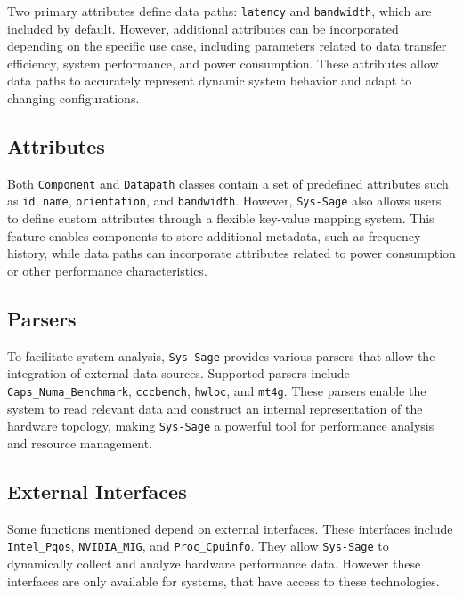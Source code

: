 Two primary attributes define data paths: \texttt{latency} and \texttt{bandwidth}, which are included by default. However, additional attributes can be incorporated depending on the specific use case, including parameters related to data transfer efficiency, system performance, and power consumption. These attributes allow data paths to accurately represent dynamic system behavior and adapt to changing configurations.\cite[see Data Path]{sys-sage-docu}

\subsection{Attributes}

Both \texttt{Component} and \texttt{Datapath} classes contain a set of predefined attributes such as \texttt{id}, \texttt{name}, \texttt{orientation}, and \texttt{bandwidth}. However, \texttt{Sys-Sage} also allows users to define custom attributes through a flexible key-value mapping system. This feature enables components to store additional metadata, such as frequency history, while data paths can incorporate attributes related to power consumption or other performance characteristics.\cite[see Component, Datapath]{sys-sage-docu}

\subsection{Parsers}

To facilitate system analysis, \texttt{Sys-Sage} provides various parsers that allow the integration of external data sources. Supported parsers include \texttt{Caps\_Numa\_Benchmark}, \texttt{cccbench}, \texttt{hwloc}, and \texttt{mt4g}. These parsers enable the system to read relevant data and construct an internal representation of the hardware topology, making \texttt{Sys-Sage} a powerful tool for performance analysis and resource management.\cite[see Data Parsers Documentation]{sys-sage-docu}

\subsection{External Interfaces}

Some functions mentioned depend on external interfaces. These interfaces include \texttt{Intel\_Pqos}, \texttt{NVIDIA\_MIG}, and \texttt{Proc\_Cpuinfo}. They allow \texttt{Sys-Sage} to dynamically collect and analyze hardware performance data. However these interfaces are only available for systems, that have access to these technologies.\cite{sys-sage-docu}

